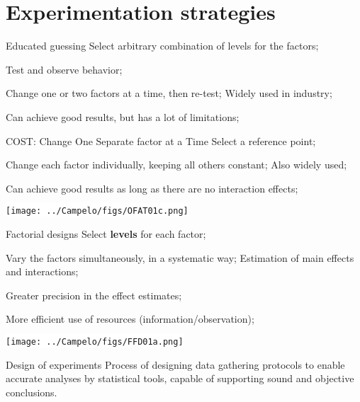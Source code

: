 \part{Experimentation strategies}
\frame{\partpage}

\begin{frame}{Educated guessing}
\bitems Select arbitrary combination of levels for the factors;
			\item Test and observe behavior; 
			\item Change one or two factors at a time, then re-test;
		\eitem
		\bitems Widely used in industry;
\item Can achieve good results, but has a lot of limitations;
\eitem
\end{frame}

\begin{frame}{COST: Change One Separate factor at a Time}
		\bitems Select a reference point;
			\item Change each factor individually, keeping all others constant;
		\eitem
	\bitems Also widely used;
		\item Can achieve good results as long as there are no interaction effects;
	\eitem
\begin{center}
	\colorbox{white}{\texttt{[image: ../Campelo/figs/OFAT01c.png]}}
\end{center}
\end{frame}

\begin{frame}{Factorial designs}
		\bitems Select \textbf{levels} for each factor;
			\item Vary the factors simultaneously, in a systematic way;
		\eitem
	\bitems Estimation of main effects and interactions;
		\item Greater precision in the effect estimates;
		\item More efficient use of resources (information/observation);
	\eitem
\begin{center}
	\colorbox{white}{\texttt{[image: ../Campelo/figs/FFD01a.png]}}
\end{center}
\end{frame}

\begin{frame}{Design of experiments}
Process of designing data gathering protocols to enable
accurate analyses by statistical tools, capable of supporting
sound and objective conclusions.
\end{frame}

